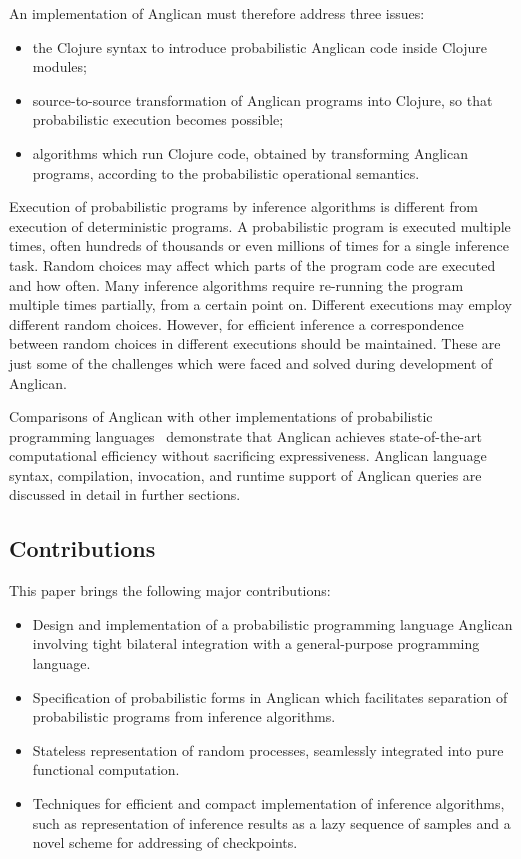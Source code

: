 \documentclass[preprint]{sigplanconf}
\begin{document}
An implementation of Anglican must therefore address three issues:
\begin{itemize}
    \item the Clojure syntax to introduce probabilistic Anglican
        code inside Clojure modules;
    \item source-to-source transformation of Anglican programs
        into Clojure, so that probabilistic execution becomes
        possible;
    \item algorithms which run Clojure code, obtained by
        transforming Anglican programs, according to the
        probabilistic operational semantics.
\end{itemize}
Execution of probabilistic programs by inference algorithms is
different from execution of deterministic programs.  A
probabilistic program is executed multiple times, often hundreds
of thousands or even millions of times for a single inference
task. Random choices may affect which parts of the program code
are executed and how often. Many inference algorithms require
re-running the program multiple times partially, from a certain
point on.  Different executions may employ different random
choices. However, for efficient inference a correspondence
between random choices in different executions should be
maintained. These are just some of the challenges which were
faced and solved during development of Anglican.

Comparisons of Anglican with other implementations of
probabilistic programming languages~\cite{SGG15}\cite[pp.
32--33]{P16} demonstrate that Anglican achieves state-of-the-art
computational efficiency without sacrificing expressiveness.
Anglican language syntax, compilation, invocation, and runtime
support of Anglican queries are discussed in detail in further
sections.

\subsection*{Contributions} This paper brings the following
major contributions:
\begin{itemize}
    \item Design and implementation of a probabilistic programming language
        Anglican involving tight bilateral integration with a general-purpose
        programming language.
    \item Specification of probabilistic forms in Anglican which facilitates 
        separation of probabilistic programs from inference algorithms.
    \item Stateless representation of random processes, seamlessly integrated
        into pure functional computation.
    \item Techniques for efficient and compact implementation of inference
        algorithms, such as representation of inference results as a lazy
        sequence of samples and a novel scheme for addressing of checkpoints.
\end{itemize}
\end{document}

